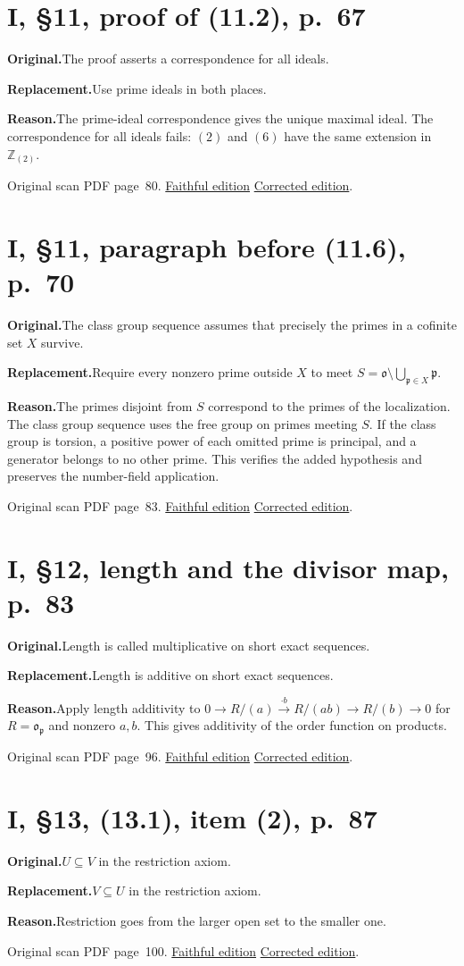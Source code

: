 \documentclass[11pt,a4paper]{article}
\newcommand{\original}{\par\smallskip\noindent\textbf{Original.}\enspace}
\newcommand{\replacement}{\par\smallskip\noindent\textbf{Replacement.}\enspace}
\newcommand{\reason}{\par\smallskip\noindent\textbf{Reason.}\enspace}
\newcommand{\editionlink}[3]{\href{#1\#errata.#2}{#3}}
\newcommand{\location}[2]{%
  \par\smallskip\noindent Original scan PDF page~#2.\enspace
  \editionlink{Neukirch_Faithful.pdf}{#1}{Faithful edition}
  \quad\editionlink{Neukirch_Corrected.pdf}{#1}{Corrected edition}.}
\begin{document}
\setcounter{section}{8}
\section{I, \S11, proof of (11.2), p.~67}\label{errata:item:9}
\original The proof asserts a correspondence for all ideals.
\replacement Use prime ideals in both places.
\reason The prime-ideal correspondence gives the unique maximal ideal. The correspondence for all ideals fails: $(2)$ and $(6)$ have the same extension in $\mathbb Z_{(2)}$.
\location{9}{80}

\setcounter{section}{9}
\section{I, \S11, paragraph before (11.6), p.~70}\label{errata:item:10}
\original The class group sequence assumes that precisely the primes in a cofinite set $X$ survive.
\replacement Require every nonzero prime outside $X$ to meet $S=\mathfrak o\setminus\bigcup_{\mathfrak p\in X}\mathfrak p$.
\reason The primes disjoint from $S$ correspond to the primes of the localization. The class group sequence uses the free group on primes meeting $S$. If the class group is torsion, a positive power of each omitted prime is principal, and a generator belongs to no other prime. This verifies the added hypothesis and preserves the number-field application.
\location{10}{83}

\setcounter{section}{10}
\section{I, \S12, length and the divisor map, p.~83}\label{errata:item:11}
\original Length is called multiplicative on short exact sequences.
\replacement Length is additive on short exact sequences.
\reason Apply length additivity to $0\to R/(a)\xrightarrow{\cdot b}R/(ab)\to R/(b)\to0$ for $R=\mathfrak o_{\mathfrak p}$ and nonzero $a,b$. This gives additivity of the order function on products.
\location{11}{96}

\setcounter{section}{11}
\section{I, \S13, (13.1), item (2), p.~87}\label{errata:item:12}
\original $U\subseteq V$ in the restriction axiom.
\replacement $V\subseteq U$ in the restriction axiom.
\reason Restriction goes from the larger open set to the smaller one.
\location{12}{100}
\end{document}
